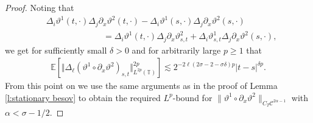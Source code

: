 \documentclass[a4paper,11pt]{article}
\theoremstyle{remark}
\newcommand{\E}{\mathbb{E}}
\newcommand{\CC}{\ensuremath{\mathscr{C}}}
\newcommand{\reso}{\,\mathord{\circ}\,}
\begin{document}
\begin{proof}
   Noting that
   \begin{align*}
      &\Delta_i \vartheta^1(t,\cdot) \Delta_j \partial_x \vartheta^2(t,\cdot) - \Delta_i \vartheta^1(s,\cdot) \Delta_j \partial_x \vartheta^2(s,\cdot) \\
      &\hspace{80pt} = \Delta_i \vartheta^1(t,\cdot) \Delta_j \partial_x \vartheta^2_{s,t} + \Delta_i \vartheta^1_{s,t} \Delta_j \partial_x \vartheta^2(s,\cdot),
   \end{align*}
   we get for sufficiently small $\delta > 0$ and for arbitrarily large $p\geqslant 1$ that
   \begin{align*}
      \E [\Vert  \Delta_{\ell} (\vartheta^1 \reso \partial_x \vartheta^2)_{s,t} \Vert_{L^{2 p}(\mathbb{T} )}^{2 p}] \lesssim 2^{-2\ell(2\sigma - 2 - \sigma \delta ) p} |t - s|^{\delta p}.
   \end{align*}
   From this point on we use the same arguments as in the proof of Lemma \ref{l:stationary besov} to obtain the required $L^p$-bound for $\| \vartheta^1\reso \partial_x \vartheta^2\|_{C_T \CC^{2\alpha-1}}$ with $\alpha < \sigma - 1 / 2$.
\end{proof}
\end{document}
